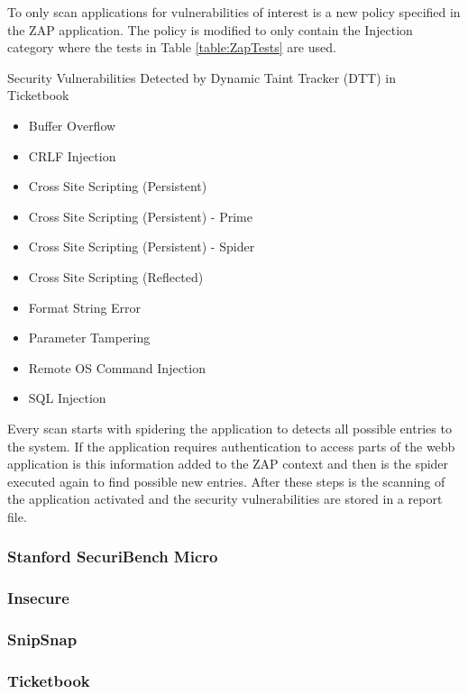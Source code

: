 To only scan applications for vulnerabilities of interest is a new policy specified in the ZAP application. The policy is modified to only contain the Injection category where the tests in Table \ref{table:ZapTests} are used.

\begin{table}[!hbt]
  \centering
  \caption{Security Vulnerabilities Detected by Dynamic Taint Tracker (DTT) in Ticketbook}
	\label{table:ZapTests}
	\begin{itemize}
		\item Buffer Overflow
		\item CRLF Injection
		\item Cross Site Scripting (Persistent)
		\item Cross Site Scripting (Persistent) - Prime
		\item Cross Site Scripting (Persistent) - Spider
		\item Cross Site Scripting (Reflected)
		\item Format String Error
		\item Parameter Tampering
		\item Remote OS Command Injection
		\item SQL Injection
	\end{itemize}
\end{table}

Every scan starts with spidering the application to detects all possible entries to the system. If the application requires authentication to access parts of the webb application is this information added to the ZAP context and then is the spider executed again to find possible new entries. After these steps is the scanning of the application activated and the security vulnerabilities are stored in a report file. 



\subsubsection{Stanford SecuriBench Micro}
\subsubsection{Insecure}
\subsubsection{SnipSnap}
\subsubsection{Ticketbook}
